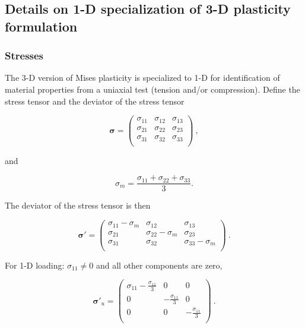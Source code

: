 \documentclass[11pt]{report}
\numberwithin{equation}{section}
\newcommand{\bmf } {\boldsymbol }
\begin{document}
\subsection{Details on 1-D specialization of 3-D plasticity formulation}

\subsubsection{Stresses}
The 3-D version of Mises plasticity is specialized to 1-D for identification of material 
properties from a uniaxial test (tension and/or compression). Define the
stress tensor and the deviator of the stress tensor

\begin{equation}
\bmf \sigma =
 \begin{pmatrix}
     \sigma_{11} & \sigma_{12} & \sigma_{13} \\
     \sigma_{21} & \sigma_{22} & \sigma_{23} \\
     \sigma_{31} & \sigma_{32} & \sigma_{33} \\
 \end{pmatrix}~,
\end{equation}
     
\noindent and

\begin{equation}
\sigma_m = \frac{\sigma_{11} + \sigma_{22} + \sigma_{33}}{3}.
\end{equation}

\noindent The deviator of the stress tensor is then

\begin{equation}
\bmf \sigma' =
 \begin{pmatrix}
     \sigma_{11}-\sigma_m & \sigma_{12} & \sigma_{13} \\
     \sigma_{21} & \sigma_{22}-\sigma_m & \sigma_{23} \\
     \sigma_{31} & \sigma_{32} & \sigma_{33}-\sigma_m \\
 \end{pmatrix}~.
\end{equation}

\noindent For 1-D loading: $\sigma_{11} \ne 0$ and all other components are zero,

\begin{equation} \label{E:sigmadev_tensor_1D}
\bmf \sigma'_u =
 \begin{pmatrix}
     \sigma_{11}-\frac{\sigma_{11}}{3} & 0 & 0 \\
      0 & -\frac{\sigma_{11}}{3} & 0 \\
     0 & 0 & -\frac{\sigma_{11}}{3}\\
 \end{pmatrix}~.
\end{equation}
\end{document}
